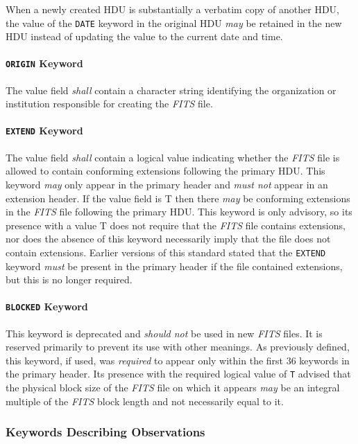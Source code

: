 \documentclass[11pt,makeidx]{book}     %
\begin{document}
 When a newly created HDU is substantially a verbatim copy of  
 another HDU, the value of the {\tt DATE} keyword in the original
 HDU {\em may} be retained in the new HDU instead of updating
 the value to the current date and time.


 \paragraph{{\tt ORIGIN} Keyword}
 The value field {\em shall} contain a character 
 string
 identifying the organization or institution responsible for
 creating the {\em FITS\/} file.
  
   \paragraph{{\tt EXTEND} Keyword}
   \label{s:ext}
 The value field {\em shall} contain a logical value indicating whether
 the {\em FITS} file is allowed to contain conforming extensions following
 the primary HDU.
 This keyword  {\em may} only appear in the primary header
 and {\em must not} appear in an extension header.  
 If the value field is T then there {\em may} be
 conforming extensions in the {\em FITS\/} file following the primary HDU.
 This keyword is only advisory, so its presence with a value T does not 
 require that the {\em FITS\/} file contains extensions, 
 nor does the absence of this keyword necessarily imply that the 
 file does not contain extensions.
 Earlier versions of this standard stated that the {\tt EXTEND}
 keyword {\em must} be present in the primary header if the file contained
 extensions, but this is no longer required.

 \paragraph{{\tt BLOCKED} Keyword}
  This keyword is deprecated and {\em should not} be used in new 
  {\em FITS\/} files.  It is reserved primarily to prevent its use
 with other meanings.
 As previously defined, this keyword, if used, was {\em required} to appear only 
 within the first 36 keywords  in the primary  \label{s:block}
 header.  Its presence with the required logical value of {\tt T} advised that 
 the physical block size of the {\em FITS\/} file on which it
 appears {\em may} be an integral multiple of the {\em FITS\/} block length
 and not necessarily equal to it.
  
     \subsubsection{Keywords Describing Observations}
     \label{s:kobs}
\end{document}
